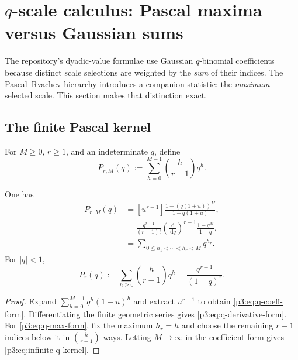 \documentclass[11pt,oneside]{article}
\theoremstyle{definition}
\theoremstyle{remark}
\newcommand{\dd}{\,\mathrm d}
\begin{document}
\section{\texorpdfstring{$q$}{q}-scale calculus: Pascal maxima versus Gaussian sums}\label{p3:sec:qcalculus}

The repository's dyadic-value formulae use Gaussian $q$-binomial coefficients because distinct scale selections are weighted by the \emph{sum} of their indices.  The Pascal--Rvachev hierarchy introduces a companion statistic: the \emph{maximum} selected scale.  This section makes that distinction exact.

\subsection{The finite Pascal kernel}

For $M\ge0$, $r\ge1$, and an indeterminate $q$, define
\begin{equation}\label{p3:eq:pascal-q-kernel}
  P_{r,M}(q):=\sum_{h=0}^{M-1}\binom h{r-1}q^h.
\end{equation}

\begin{proposition}\label{p3:prop:finite-q-kernel}
One has
\begin{align}
 P_{r,M}(q)
 &= [u^{r-1}]\frac{1-(q(1+u))^M}{1-q(1+u)},\label{p3:eq:q-coeff-form}\\
 &=\frac{q^{r-1}}{(r-1)!}
   \left(\frac{\dd}{\dd q}\right)^{r-1}
   \frac{1-q^M}{1-q},\label{p3:eq:q-derivative-form}\\
 &=\sum_{0\le h_1<\cdots<h_r<M}q^{h_r}.\label{p3:eq:q-max-form}
\end{align}
For $|q|<1$,
\begin{equation}\label{p3:eq:infinite-q-kernel}
  P_r(q):=\sum_{h\ge0}\binom h{r-1}q^h
  =\frac{q^{r-1}}{(1-q)^r}.
\end{equation}
\end{proposition}

\begin{proof}
Expand
$\sum_{h=0}^{M-1}q^h(1+u)^h$ and extract $u^{r-1}$ to obtain \eqref{p3:eq:q-coeff-form}.  Differentiating the finite geometric series gives \eqref{p3:eq:q-derivative-form}.  For \eqref{p3:eq:q-max-form}, fix the maximum $h_r=h$ and choose the remaining $r-1$ indices below it in $\binom h{r-1}$ ways.  Letting $M\to\infty$ in the coefficient form gives \eqref{p3:eq:infinite-q-kernel}.
\end{proof}
\end{document}
